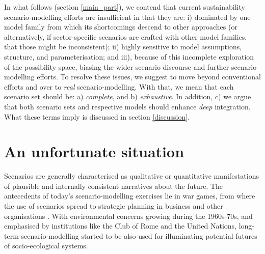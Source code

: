 \documentclass{article}
\begin{document}
\begin{refsection}

In what follows (section \ref{main_part}), we contend that current sustainability scenario-modelling efforts are insufficient in that they are: i) dominated by one model family from which its shortcomings descend to other approaches (or alternatively, if sector-specific scenarios are crafted with other model families, that those might be inconsistent); ii) highly sensitive to model assumptions, structure, and parameterisation; and iii), because of this incomplete exploration of the possibility space, biasing the wider scenario discourse and further scenario modelling efforts. To resolve these issues, we suggest to move beyond conventional efforts and over to \textit{real} scenario-modelling. With that, we mean that each scenario set should be: a) \textit{complete}, and b) \textit{exhaustive}. In addition, c) we argue that both scenario sets and respective models should enhance \textit{deep} integration. What these terms imply is discussed in section \ref{discussion}.


\label{main_part}
\section{An unfortunate situation}

Scenarios are generally characterised as qualitative or quantitative manifestations of plausible and internally consistent narratives about the future. The antecedents of today's scenario-modelling exercises lie in war games, from where the use of scenarios spread to strategic planning in business and other organisations \parencite{bradfield_2005,schoemaker_1993}.\footnotemark{} With environmental concerns growing during the 1960s-70s, and emphasised by institutions like the Club of Rome and the United Nations, long-term scenario-modelling started to be also used for illuminating potential futures of socio-ecological systems.



\end{refsection}
\end{document}
